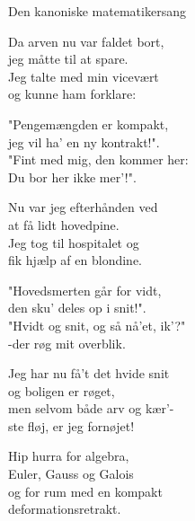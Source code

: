 \begin{song}{Den kanoniske matematikersang}
  \begin{SBVerse}
	Da arven nu var faldet bort,\\
	jeg måtte til at spare.\\
	Jeg talte med min vicevært\\
	og kunne ham forklare:
  \end{SBVerse}

  \begin{SBSection*}
	"Pengemængden er kompakt,\\
	jeg vil ha' en ny kontrakt!".\\
	"Fint med mig, den kommer her:\\
	Du bor her ikke mer'!".
  \end{SBSection*}

  \begin{SBVerse}
	Nu var jeg efterhånden ved\\
	at få lidt hovedpine.\\
	Jeg tog til hospitalet og\\
	fik hjælp af en blondine.
  \end{SBVerse}

  \begin{SBSection*}
	"Hovedsmerten går for vidt,\\
	den sku' deles op i snit!".\\
	"Hvidt og snit, og så nå'et, ik'?"\\
	-der røg mit overblik.
  \end{SBSection*}

  \begin{SBVerse}
	Jeg har nu få't det hvide snit\\
	og boligen er røget,\\
	men selvom både arv og kær'-\\
	ste fløj, er jeg fornøjet!
  \end{SBVerse}

  \begin{SBChorus}
	Hip hurra for algebra,\\
	Euler, Gauss og Galois\\
	og for rum med en kompakt\\
	deformationsretrakt.
  \end{SBChorus}
\end{song}





